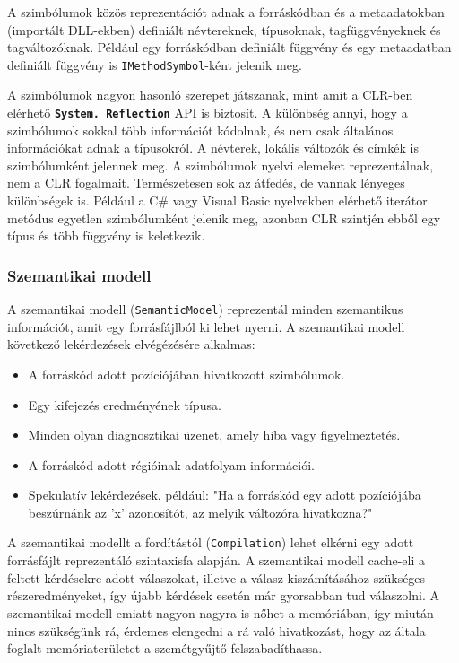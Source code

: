 \documentclass[12pt, a4paper]{report}
\newcommand{\f}[1]{\texttt{#1}}
\newcommand{\ff}[1]{\textbf{\texttt{#1}}}
\begin{document}
A szimbólumok közös reprezentációt adnak a forráskódban és a metaadatokban (importált DLL-ekben) definiált névtereknek, típusoknak, tagfüggvényeknek és tagváltozóknak. Például egy forráskódban definiált függvény és egy metaadatban definiált függvény is \f{IMethodSymbol}-ként jelenik meg.

A szimbólumok nagyon hasonló szerepet játszanak, mint amit a CLR-ben elérhető \ff{System. Reflection} API is biztosít. A különbség annyi, hogy a szimbólumok sokkal több információt kódolnak, és nem csak általános információkat adnak a típusokról. A névterek, lokális változók és címkék is szimbólumként jelennek meg. A szimbólumok nyelvi elemeket reprezentálnak, nem a CLR fogalmait. Természetesen sok az átfedés, de vannak lényeges különbségek is. Például a C\# vagy Visual Basic nyelvekben elérhető iterátor metódus egyetlen szimbólumként jelenik meg, azonban CLR szintjén ebből egy típus és több függvény is keletkezik.

\subsubsection{Szemantikai modell}

A szemantikai modell (\f{SemanticModel}) reprezentál minden szemantikus információt, amit egy forrásfájlból ki lehet nyerni. A szemantikai modell következő lekérdezések elvégézésére alkalmas:
\begin{itemize}
\item A forráskód adott pozíciójában hivatkozott szimbólumok.
\item Egy kifejezés eredményének típusa.
\item Minden olyan diagnosztikai üzenet, amely hiba vagy figyelmeztetés.
\item A forráskód adott régióinak adatfolyam információi.
\item Spekulatív lekérdezések, például: "Ha a forráskód egy adott pozíciójába beszúrnánk az 'x' azonosítót, az melyik változóra hivatkozna?"
\end{itemize}

A szemantikai modellt a fordítástól (\f{Compilation}) lehet elkérni egy adott forrásfájlt reprezentáló szintaxisfa alapján. A szemantikai modell cache-eli a feltett kérdésekre adott válaszokat, illetve a válasz kiszámításához szükséges részeredményeket, így újabb kérdések esetén már gyorsabban tud válaszolni. A szemantikai modell emiatt nagyon nagyra is nőhet a memóriában, így miután nincs szükségünk rá, érdemes elengedni a rá való hivatkozást, hogy az általa foglalt memóriaterületet a szemétgyűjtő felszabadíthassa.
\end{document}

